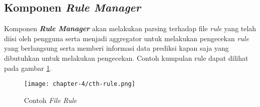 \subsection{Komponen \textit{Rule Manager}}

Komponen \textbf{\textit{Rule Manager}} akan melakukan parsing terhadap file \textit{rule} yang telah diisi oleh pengguna serta menjadi aggregator untuk melakukan pengecekan \textit{rule} yang berlangsung serta memberi informasi data prediksi kapan saja yang dibutuhkan untuk melakukan pengecekan. Contoh kumpulan rule dapat dilihat pada gambar \ref{fig:rule-example}.

\begin{figure}[h]
    \centering
    \texttt{[image: chapter-4/cth-rule.png]}
    \caption{Contoh \textit{File Rule}}
    \label{fig:rule-example}
\end{figure} 


